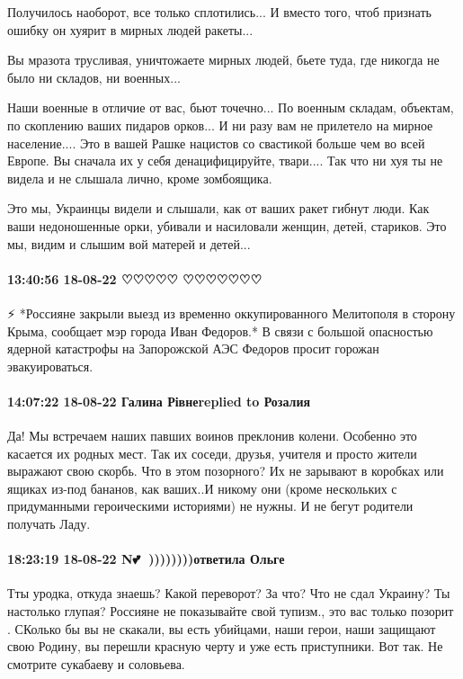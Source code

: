 Получилось наоборот, все только сплотились... И вместо того, чтоб признать
ошибку он хуярит в мирных людей ракеты...

Вы мразота трусливая, уничтожаете мирных людей, бьете туда, где никогда не было
ни складов, ни военных...

Наши военные в отличие от вас, бьют точечно... По военным складам, объектам, по
скоплению ваших пидаров орков... И ни разу вам не прилетело на мирное
население.... Это в вашей Рашке нацистов со свастикой больше чем во всей
Европе. Вы сначала их у себя денацифицируйте, твари.... Так что ни хуя ты не
видела и не слышала лично, кроме зомбоящика.

Это мы, Украинцы видели и слышали, как от ваших ракет гибнут люди. Как ваши
недоношенные орки, убивали и насиловали женщин, детей, стариков. Это мы, видим
и слышим вой матерей и детей...

\paragraph{13:40:56 18-08-22 ♡♡♡♡♡ ♡♡♡♡♡♡♡}

⚡️ *Россияне закрыли выезд из временно оккупированного Мелитополя в сторону
Крыма, сообщает мэр города Иван Федоров.*
В связи с большой опасностью ядерной катастрофы на Запорожской АЭС Федоров
просит горожан эвакуироваться.

\paragraph{14:07:22 18-08-22 Галина Рівнеreplied to Розалия}

Да! Мы встречаем наших павших воинов преклонив колени. Особенно это касается их
родных мест. Так их соседи, друзья, учителя и просто жители выражают свою
скорбь. Что в этом позорного? Их не зарывают в коробках или ящиках из-под
бананов, как ваших..И никому они (кроме нескольких с придуманными героическими
историями) не нужны. И не бегут родители получать Ладу.

\paragraph{18:23:19 18-08-22 N💕🌹 ))))))))ответила Ольге}

Тты уродка, откуда знаешь? Какой переворот? За что? Что не сдал Украину? Ты
настолько глупая? Россияне не показывайте свой тупизм., это вас только позорит
. СКолько бы вы не скакали, вы есть убийцами, наши герои, наши защищают свою
Родину, вы перешли красную черту и уже есть приступники. Вот так. Не смотрите
сукабаеву и соловьева.

